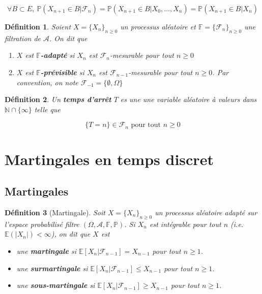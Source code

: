\documentclass[10pt,a4paper,oneside]{article}
\newtheorem{definition}{Définition}
\begin{document}
\[ \forall B \subset E,\ \mathbb{P}(X_{n + 1} \in B | \mathcal{F}_n) = \mathbb{P}(X_{n + 1} \in B | X_0,\ldots,X_n) = \mathbb{P}(X_{n + 1} \in B | X_n) \]

\begin{definition}
Soient $X = \{ X_n \}_{n \geq 0}$ un processus aléatoire et $\mathbb{F} = \{ \mathcal{F}_n \}_{n \geq 0}$ une filtration de $\mathcal{A}$. On dit que

\begin{enumerate}
\item
$X$ est \textbf{$\mathbb{F}$-adapté} si $X_n$ est $\mathcal{F}_n$-mesurable pour tout $n \geq 0$

\item
$X$ est \textbf{$\mathbb{F}$-prévisible} si $X_n$ est $\mathcal{F}_{n - 1}$-mesurable pour tout $n \geq 0$. Par convention, on note $\mathcal{F}_{-1} = \{ \emptyset, \Omega \}$
\end{enumerate}
\end{definition}

\begin{definition}
Un \textbf{temps d'arrêt} $T$ es une une variable aléatoire à valeurs dans $\mathbb{N} \cap \{ \infty \}$ telle que

\[ \{ T = n \} \in \mathcal{F}_n \text{ pour tout } n \geq 0 \]
\end{definition}

\section{Martingales en temps discret}

\subsection{Martingales}

\begin{definition}[Martingale]
Soit $X = \{ X_n \}_{n \geq 0}$ un processus aléatoire adapté sur l'espace probabilisé filtre $(\Omega, \mathcal{A}, \mathbb{F}, \mathbb{P})$. Si $X_n$ est intégrable pour tout $n$ (i.e. $\mathbb{E}(|X_n|) < \infty$), on dit que $X$ est

\begin{itemize}
\item
une \textbf{martingale} si $\mathbb{E}[X_n | \mathcal{F}_{n - 1}] = X_{n - 1}$ pour tout $n \geq 1$.
\item
une \textbf{surmartingale} si $\mathbb{E}[X_n | \mathcal{F}_{n - 1}] \leq X_{n - 1}$ pour tout $n \geq 1$.
\item
une \textbf{sous-martingale} si $\mathbb{E}[X_n | \mathcal{F}_{n - 1}] \geq X_{n - 1}$ pour tout $n \geq 1$.
\end{itemize}
\end{definition}
\end{document}
